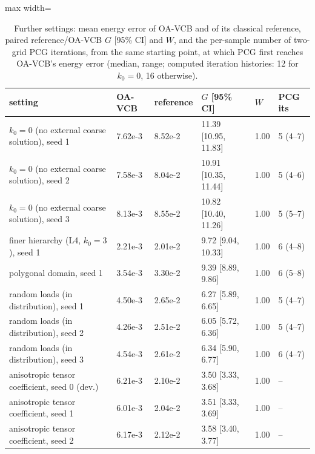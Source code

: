 \begin{table}[tbp]\centering\footnotesize\setlength{\tabcolsep}{4pt}
\caption{Further settings: mean energy error of OA-VCB and of its classical reference, paired reference/OA-VCB $G$ [95\% CI] and $W$, and the per-sample number of two-grid PCG iterations, from the same starting point, at which PCG first reaches OA-VCB's energy error (median, range; computed iteration histories: 12 for $k_0=0$, 16 otherwise).}\label{tab:settings}
\begin{adjustbox}{max width=\linewidth}
\begin{tabular}{llllll}\toprule
setting & OA-VCB & reference & $G$ [95\% CI] & $W$ & PCG its \\\midrule
$k_0=0$ (no external coarse solution), seed 1 & 7.62e-3 & 8.52e-2 & 11.39 [10.95, 11.83] & 1.00 & 5 (4--7) \\
$k_0=0$ (no external coarse solution), seed 2 & 7.58e-3 & 8.04e-2 & 10.91 [10.35, 11.44] & 1.00 & 5 (4--6) \\
$k_0=0$ (no external coarse solution), seed 3 & 8.13e-3 & 8.55e-2 & 10.82 [10.40, 11.26] & 1.00 & 5 (5--7) \\
finer hierarchy (L4, $k_0=3$), seed 1 & 2.21e-3 & 2.01e-2 & 9.72 [9.04, 10.33] & 1.00 & 6 (4--8) \\
polygonal domain, seed 1 & 3.54e-3 & 3.30e-2 & 9.39 [8.89, 9.86] & 1.00 & 6 (5--8) \\
random loads (in distribution), seed 1 & 4.50e-3 & 2.65e-2 & 6.27 [5.89, 6.65] & 1.00 & 5 (4--7) \\
random loads (in distribution), seed 2 & 4.26e-3 & 2.51e-2 & 6.05 [5.72, 6.36] & 1.00 & 5 (4--7) \\
random loads (in distribution), seed 3 & 4.54e-3 & 2.61e-2 & 6.34 [5.90, 6.77] & 1.00 & 6 (4--7) \\
anisotropic tensor coefficient, seed 0 (dev.) & 6.21e-3 & 2.10e-2 & 3.50 [3.33, 3.68] & 1.00 & -- \\
anisotropic tensor coefficient, seed 1 & 6.01e-3 & 2.04e-2 & 3.51 [3.33, 3.69] & 1.00 & -- \\
anisotropic tensor coefficient, seed 2 & 6.17e-3 & 2.12e-2 & 3.58 [3.40, 3.77] & 1.00 & -- \\
\bottomrule\end{tabular}
\end{adjustbox}
\end{table}
